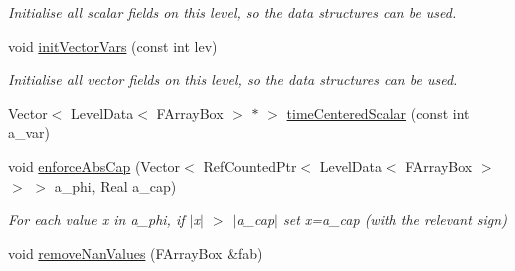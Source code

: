 \begin{DoxyCompactItemize}
\begin{DoxyCompactList}\small\item\em Initialise all scalar fields on this level, so the data structures can be used. \end{DoxyCompactList}\item 
\hypertarget{classamr_mushy_layer_a92d0abef37c6cdb9e3546624c96a6ac7}{void \hyperlink{classamr_mushy_layer_a92d0abef37c6cdb9e3546624c96a6ac7}{init\-Vector\-Vars} (const int lev)}\label{classamr_mushy_layer_a92d0abef37c6cdb9e3546624c96a6ac7}

\begin{DoxyCompactList}\small\item\em Initialise all vector fields on this level, so the data structures can be used. \end{DoxyCompactList}\item 
Vector$<$ Level\-Data$<$ F\-Array\-Box $>$ $\ast$ $>$ \hyperlink{classamr_mushy_layer_a7b11792039dd642fccc7af0e757408f4}{time\-Centered\-Scalar} (const int a\-\_\-var)
\item 
\hypertarget{classamr_mushy_layer_a927fa5b33122ac70bb19a9d65d0c4416}{void \hyperlink{classamr_mushy_layer_a927fa5b33122ac70bb19a9d65d0c4416}{enforce\-Abs\-Cap} (Vector$<$ Ref\-Counted\-Ptr$<$ Level\-Data$<$ F\-Array\-Box $>$ $>$ $>$ a\-\_\-phi, Real a\-\_\-cap)}\label{classamr_mushy_layer_a927fa5b33122ac70bb19a9d65d0c4416}

\begin{DoxyCompactList}\small\item\em For each value x in a\-\_\-phi, if $\vert$x$\vert$ $>$ $\vert$a\-\_\-cap$\vert$ set x=a\-\_\-cap (with the relevant sign) \end{DoxyCompactList}\item 
\hypertarget{classamr_mushy_layer_a627e21c7786688fc1723e738f6f3ce0e}{void \hyperlink{classamr_mushy_layer_a627e21c7786688fc1723e738f6f3ce0e}{remove\-Nan\-Values} (F\-Array\-Box \&fab)}\label{classamr_mushy_layer_a627e21c7786688fc1723e738f6f3ce0e}


\end{DoxyCompactItemize}
